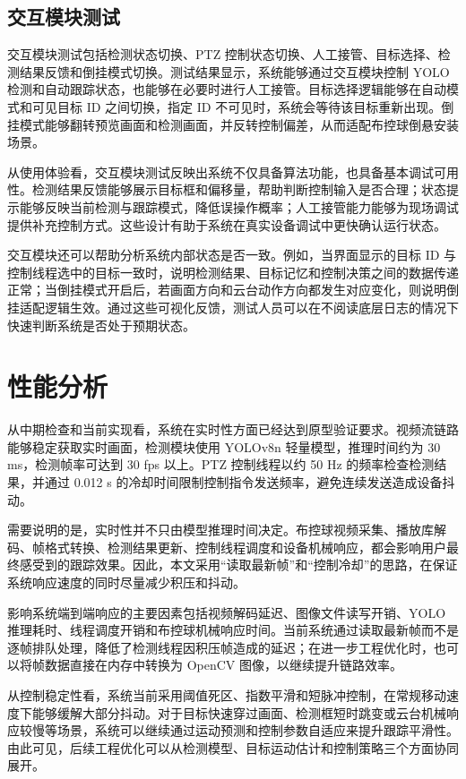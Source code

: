 \subsection{交互模块测试}

交互模块测试包括检测状态切换、PTZ 控制状态切换、人工接管、目标选择、检测结果反馈和倒挂模式切换。测试结果显示，系统能够通过交互模块控制 YOLO 检测和自动跟踪状态，也能够在必要时进行人工接管。目标选择逻辑能够在自动模式和可见目标 ID 之间切换，指定 ID 不可见时，系统会等待该目标重新出现。倒挂模式能够翻转预览画面和检测画面，并反转控制偏差，从而适配布控球倒悬安装场景。

从使用体验看，交互模块测试反映出系统不仅具备算法功能，也具备基本调试可用性。检测结果反馈能够展示目标框和偏移量，帮助判断控制输入是否合理；状态提示能够反映当前检测与跟踪模式，降低误操作概率；人工接管能力能够为现场调试提供补充控制方式。这些设计有助于系统在真实设备调试中更快确认运行状态。

交互模块还可以帮助分析系统内部状态是否一致。例如，当界面显示的目标 ID 与控制线程选中的目标一致时，说明检测结果、目标记忆和控制决策之间的数据传递正常；当倒挂模式开启后，若画面方向和云台动作方向都发生对应变化，则说明倒挂适配逻辑生效。通过这些可视化反馈，测试人员可以在不阅读底层日志的情况下快速判断系统是否处于预期状态。

\section{性能分析}

从中期检查和当前实现看，系统在实时性方面已经达到原型验证要求。视频流链路能够稳定获取实时画面，检测模块使用 YOLOv8n 轻量模型，推理时间约为 30 ms，检测帧率可达到 30 fps 以上。PTZ 控制线程以约 50 Hz 的频率检查检测结果，并通过 0.012 s 的冷却时间限制控制指令发送频率，避免连续发送造成设备抖动。

需要说明的是，实时性并不只由模型推理时间决定。布控球视频采集、播放库解码、帧格式转换、检测结果更新、控制线程调度和设备机械响应，都会影响用户最终感受到的跟踪效果。因此，本文采用“读取最新帧”和“控制冷却”的思路，在保证系统响应速度的同时尽量减少积压和抖动。

影响系统端到端响应的主要因素包括视频解码延迟、图像文件读写开销、YOLO 推理耗时、线程调度开销和布控球机械响应时间。当前系统通过读取最新帧而不是逐帧排队处理，降低了检测线程因积压帧造成的延迟；在进一步工程优化时，也可以将帧数据直接在内存中转换为 OpenCV 图像，以继续提升链路效率。

从控制稳定性看，系统当前采用阈值死区、指数平滑和短脉冲控制，在常规移动速度下能够缓解大部分抖动。对于目标快速穿过画面、检测框短时跳变或云台机械响应较慢等场景，系统可以继续通过运动预测和控制参数自适应来提升跟踪平滑性。由此可见，后续工程优化可以从检测模型、目标运动估计和控制策略三个方面协同展开。

